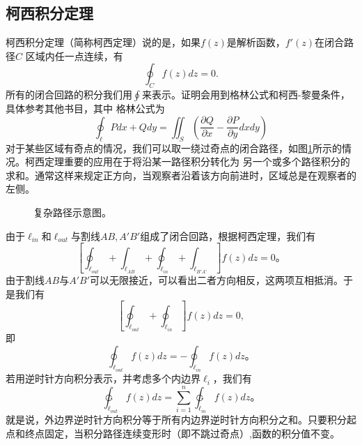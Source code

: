 \subsection{柯西积分定理}
\label{subsec:cauchy_theorem}
柯西积分定理（简称柯西定理）说的是，如果$f(z)$是解析函数，$f'(z)$在闭合路径$C$%
区域内任一点连续，有
\begin{equation}
    \oint_C f(z) dz = 0.
\end{equation}
所有的闭合回路的积分我们用$\oint$来表示。证明会用到格林公式和柯西-黎曼条件，具体参考其他书目，其中
格林公式为
\begin{equation}
    \oint_\ell P dx + Q dy = \iint_S \left( \frac{\partial Q}{\partial x} - \frac{\partial P}{\partial y} dx dy \right)
\end{equation}
对于某些区域有奇点的情况，我们可以取一绕过奇点的闭合路径，如图\ref{fig:complexregion}所示的情况。柯西定理重要的应用在于将沿某一路径积分转化为
另一个或多个路径积分的求和。通常这样来规定正方向，当观察者沿着该方向前进时，区域总是在观察者的左侧。
\begin{figure}
    \centering
    
    \caption{复杂路径示意图。}
    \label{fig:complexregion}
\end{figure}
由于$\ell_{in}$和$\ell_{out}$与割线$AB,A'B'$组成了闭合回路，根据柯西定理，我们有
\[
    \left[ \oint _{\ell_{out}} + \int _{\ell_{AB}} + \oint _{\ell_{in}} + \int _{\ell_{B'A'}} \right] f(z) dz = 0 \textrm{。}
\]   
由于割线$AB$与$A'B'$可以无限接近，可以看出二者方向相反，这两项互相抵消。于是我们有
\[
    \left[ \oint _{\ell_{out}} + \oint _{\ell_{in}}  \right] f(z) dz = 0,
\]
即
\[
    \oint_{\ell_{out}} f(z) dz = - \oint _{\ell_{in}}f(z) dz \textrm{。}
\]
若用逆时针方向积分表示，并考虑多个内边界$\ell_{i}$，我们有
\begin{equation}
    \ointctrclockwise_{\ell_{out}} f(z) dz = \sum_{i=1}^{n} \ointctrclockwise_{\ell_{in}} f(z) dz \textrm{。}
\end{equation}
就是说，外边界逆时针方向积分等于所有内边界逆时针方向积分之和。只要积分起点和终点固定，当积分路径连续变形时（即不跳过奇点）,函数的积分值不变。


